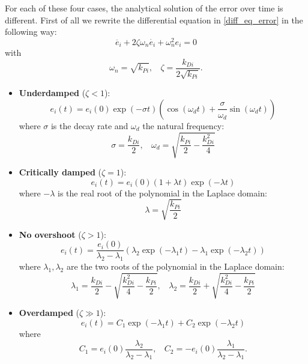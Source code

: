 \documentclass[10pt, a4paper]{report}
\begin{document}
For each of these four cases, the analytical solution of the error over time is different. First of all we rewrite the differential equation in \eqref{diff_eq_error} in the following way:\begin{equation}
 \ddot{ e_i}+2\zeta\omega_n\dot{ e_i}+\omega_n^2 e_i= 0 
\end{equation}
with\begin{equation}
    \omega_n=\sqrt{{k_{Pi}}}, \ \ \ \ 
    \zeta=\frac{k_{Di}}{2\sqrt{k_{Pi}}}.
\end{equation}
\begin{itemize}
    \item \textbf{Underdamped} ($\zeta<1$):\begin{equation}
        e_i(t)=e_{i}(0)\exp(-\sigma t)\left(
            \cos(\omega_dt)+\frac{\sigma}{\omega_d}\sin(\omega_dt)
        \right)
    \end{equation}
    where $\sigma$ is the decay rate and $\omega_d$ the natural frequency:\begin{equation}
        \sigma=\frac{k_{Di}}{2}, \ \ \ \ \omega_d=\sqrt{\frac{k_{Pi}}{2}-\frac{k_{Di}^2}{4}}
    \end{equation}
    \item \textbf{Critically damped} ($\zeta=1$):\begin{equation}
        e_i(t)=e_i(0)(1+\lambda t)\exp(-\lambda t)
    \end{equation}
    where $-\lambda$ is the real root of the polynomial in the Laplace domain:\begin{equation}
        \lambda=\sqrt{\frac{k_{Pi}}{2}}
    \end{equation}
    \item \textbf{No overshoot} ($\zeta > 1$):\begin{equation}
        e_i(t)=\frac{e_i(0)}{\lambda_2-\lambda_1}(\lambda_2\exp(-\lambda_1t)-\lambda_1\exp(-\lambda_2t))
    \end{equation}
    where $\lambda_1,\lambda_2$ are the two roots of the polynomial in the Laplace domain: \begin{equation}
        \lambda_1=\frac{k_{Di}}{2}-\sqrt{\frac{k^2_{Di}}{4}-\frac{k_{Pi}}{2}}, \ \ \ \ 
        \lambda_2= \frac{k_{Di}}{2}+\sqrt{\frac{k^2_{Di}}{4}-\frac{k_{Pi}}{2}}
    \end{equation}
    \item \textbf{Overdamped} ($\zeta\gg 1$):\begin{equation}
        e_i(t)=C_1\exp(-\lambda_1t)+C_2\exp(-\lambda_2t)
    \end{equation}
    where\begin{equation}
        C_1=e_i(0)\frac{\lambda_2}{\lambda_2-\lambda_1}, \ \ \ \  
        C_2=-e_i(0)\frac{\lambda_1}{\lambda_2-\lambda_1}.
    \end{equation}
\end{itemize}
\end{document}
